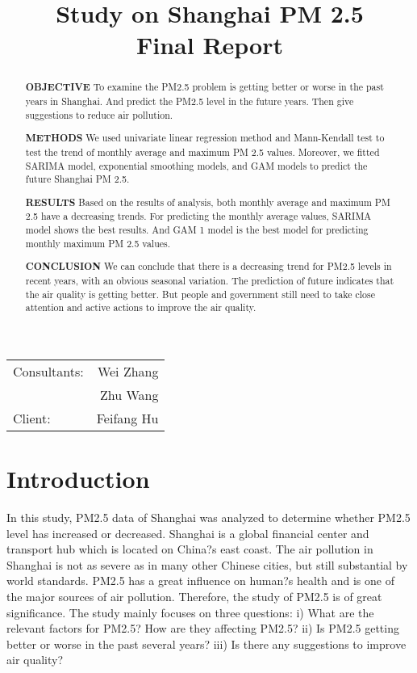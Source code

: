 \documentclass[11pt,]{article}
\title{Study on Shanghai PM 2.5 \\ Final Report } %
\begin{document}
\maketitle %

\begin{center}
\begin{tabular}{l r}
Consultants: & Wei Zhang \\ %
& Zhu Wang \\
Client: & Feifang Hu%
\end{tabular}
\end{center}

\vspace{5cm}



\begin{abstract}
\textbf{OBJECTIVE} To examine the PM2.5 problem is getting better or worse in the past years in Shanghai. And predict the PM2.5 level in the future years. Then give suggestions to reduce air pollution.

\textbf{METHODS} We used univariate linear regression method and Mann-Kendall test to test the trend of monthly average and maximum PM 2.5 values. Moreover, we fitted SARIMA model, exponential smoothing models, and GAM models to predict the future Shanghai PM 2.5.

\textbf{RESULTS} Based on the results of analysis, both monthly average and maximum PM 2.5 have a decreasing trends. For predicting the monthly average values, SARIMA model shows the best results. And GAM 1 model is the best model for predicting monthly maximum PM 2.5 values.

\textbf{CONCLUSION} We can conclude that there is a decreasing trend for PM2.5 levels in recent years, with an obvious seasonal variation. The prediction of future indicates that the air quality is getting better. But people and government still need to take close attention and active actions to improve the air quality.

\end{abstract}


\pagebreak


\section{Introduction}

In this study, PM2.5 data of Shanghai was analyzed to determine whether PM2.5 level has increased or decreased. Shanghai is a global financial center and transport hub which is located on China?s east coast. The air pollution in Shanghai is not as severe as in many other Chinese cities, but still substantial by world standards. PM2.5 has a great influence on human?s health and is one of the major sources of air pollution. Therefore, the study of PM2.5 is of great significance. The study mainly focuses on three questions: i) What are the relevant factors for PM2.5? How are they affecting PM2.5? ii) Is PM2.5 getting better or worse in the past several years? iii) Is there any suggestions to improve air quality? 
\end{document}
